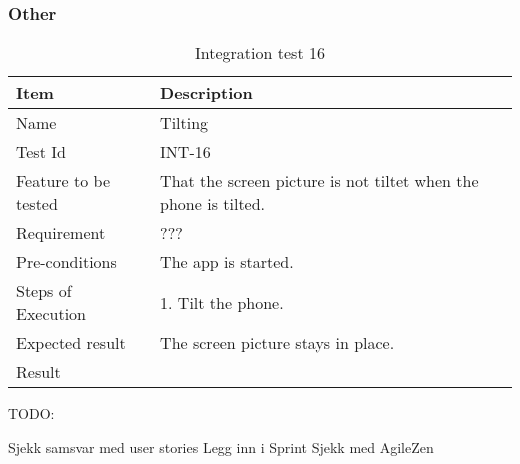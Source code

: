 \subsubsection{Other}

\begin{table}[H]
\centering
	\begin{tabular}{ l | p{8cm} }
		\hline
		{\bf Item} & {\bf Description} \\ \hline
		Name & Tilting \\ 
		Test Id & INT-16 \\ 
		Feature to be tested & That the screen picture is not tiltet when the phone is tilted. \\ 
		Requirement & ??? \\ 
		Pre-conditions & The app is started. \\ 
		Steps of Execution & 1. Tilt the phone. \\ 
		Expected result & The screen picture stays in place. \\ 
		Result & \\ 
	\end{tabular}
	\caption{Integration test 16}
\end{table}


TODO:

Sjekk samsvar med user stories
Legg inn i Sprint
Sjekk med AgileZen